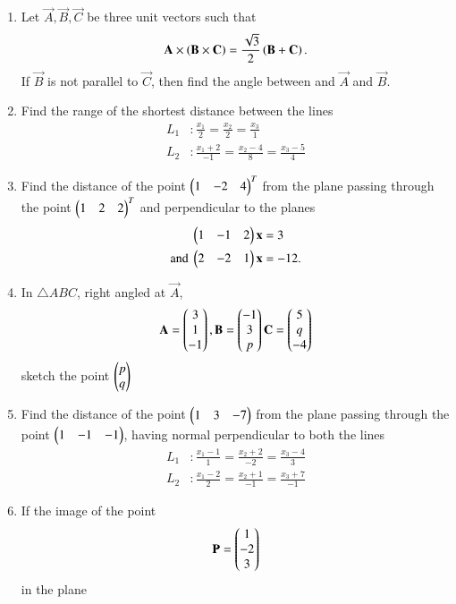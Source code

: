 \documentclass[journal,12pt,twocolumn]{IEEEtran}
\begin{document}
\begin{enumerate}[label=\arabic*.]
\item Let $\vec{A}, \vec{B}, \vec{C}$ be three unit vectors such that
\begin{equation}
\mathbf{A}\times\left(\mathbf{B}\times\mathbf{C}\right) = \frac{\sqrt{3}}{2}\left(\mathbf{B}+\mathbf{C}\right).
\end{equation}
If $\vec{B}$ is not parallel to $\vec{C}$, then find the angle between and
$\vec{A}$ and $\vec{B}$.
%
\item Find the range of the shortest distance between the lines
\begin{align}
L_1&:\frac{x_1}{2}=
\frac{x_2}{2} = 
\frac{x_3}{1}
\\
L_2&:\frac{x_1+2}{-1}=
\frac{x_2-4}{8} = 
\frac{x_3-5}{4}
\end{align}
%
\item Find the distance of the point $\begin{pmatrix}1 & -2 & 4\end{pmatrix}^T$ from the plane passing through the point $\begin{pmatrix}1 
& 2 & 2\end{pmatrix}^T$ and 
perpendicular to the planes 
\begin{align}
\begin{pmatrix}1 & -1 & 2\end{pmatrix}\mathbf{x} &= 3
\\
\text{and }\begin{pmatrix}2 & -2 & 1\end{pmatrix}\mathbf{x} &= -12.
\end{align}
\item In $\triangle ABC$, right angled at $\vec{A}$,
\begin{align}
\mathbf{A} = \begin{pmatrix}3\\ 1 \\ -1\end{pmatrix},
\mathbf{B} = \begin{pmatrix}-1\\ 3 \\ p\end{pmatrix}
\mathbf{C} = \begin{pmatrix}5\\ q \\ -4\end{pmatrix}
\end{align}
sketch the point $\begin{pmatrix}p \\ q\end{pmatrix}$
\item Find the distance of the point $\begin{pmatrix}1 & 3 & -7\end{pmatrix}$ from the plane passing through the point $\begin{pmatrix}1 & 
-1 & 
-1\end{pmatrix}$, having normal perpendicular to both the lines
\begin{align}
L_1&:\frac{x_1-1}{1}=
\frac{x_2+2}{-2} = 
\frac{x_3-4}{3}
\\
L_2&:\frac{x_1-2}{2}=
\frac{x_2+1}{-1} = 
\frac{x_3+7}{-1}
\end{align}
\item If the image of the point 
\begin{equation}
\mathbf{P}=\begin{pmatrix}1 \\ -2 \\ 3\end{pmatrix}
\end{equation}
in the plane
\begin{align}

\end{align}
\end{enumerate}
\end{document}

